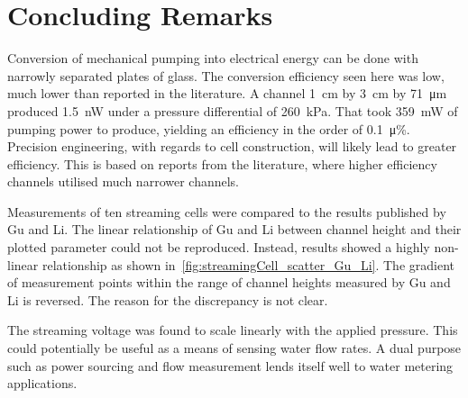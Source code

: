 \section{Concluding Remarks}
  \label{sect:part1_energyHarvesting_conclusion}

  Conversion of mechanical pumping into electrical energy can be done with narrowly separated plates of glass.
  The conversion efficiency seen here was low, much lower than reported in the literature.
  A channel \SI{1}{\centi\meter} by \SI{3}{\centi\meter} by \SI{71}{\micro\meter} produced \SI{1.5}{\nano\watt} under a pressure differential of \SI{260}{\kilo\pascal}.
  That took \SI{359}{\milli\watt} of pumping power to produce, yielding an efficiency in the order of \SI{0.1}{\micro\percent}.
  Precision engineering, with regards to cell construction, will likely lead to greater efficiency.
  This is based on reports from the literature, where higher efficiency channels utilised much narrower channels.

  Measurements of ten streaming cells were compared to the results published by Gu and Li.
  The linear relationship of Gu and Li between channel height and their plotted parameter could not be reproduced.
  Instead, results showed a highly non-linear relationship as shown in~\cref{fig:streamingCell_scatter_Gu_Li}.
  The gradient of measurement points within the range of channel heights measured by Gu and Li is reversed.
  The reason for the discrepancy is not clear.

  The streaming voltage was found to scale linearly with the applied pressure.
  This could potentially be useful as a means of sensing water flow rates.
  A dual purpose such as power sourcing and flow measurement lends itself well to water metering applications.
